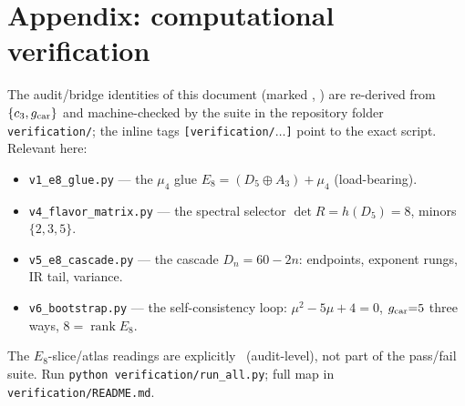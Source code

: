 \section*{Appendix: computational verification}
The audit/bridge identities of this document (marked \mE, \mE) are re-derived from $\{c_3,g_{\mathrm{car}}\}$ and
machine-checked by the suite in the repository folder \texttt{verification/}; the inline tags
\texttt{[verification/$\dots$]} point to the exact script. Relevant here:
\begin{itemize}[leftmargin=1.4em,itemsep=1pt]
\item \texttt{v1\_e8\_glue.py} --- the $\mu_4$ glue $E_8{=}(D_5{\oplus}A_3){+}\mu_4$ (load-bearing).
\item \texttt{v4\_flavor\_matrix.py} --- the spectral selector $\det R{=}h(D_5){=}8$, minors $\{2,3,5\}$.
\item \texttt{v5\_e8\_cascade.py} --- the cascade $D_n{=}60{-}2n$: endpoints, exponent rungs, IR tail, variance.
\item \texttt{v6\_bootstrap.py} --- the self-consistency loop: $\mu^2{-}5\mu{+}4{=}0$, $g_{\mathrm{car}}{=}5$ three ways, $8{=}\operatorname{rank}E_8$.
\end{itemize}
The $E_8$-slice/atlas readings are explicitly \mO\ (audit-level), not part of the pass/fail suite. Run
\texttt{python verification/run\_all.py}; full map in \texttt{verification/README.md}.


